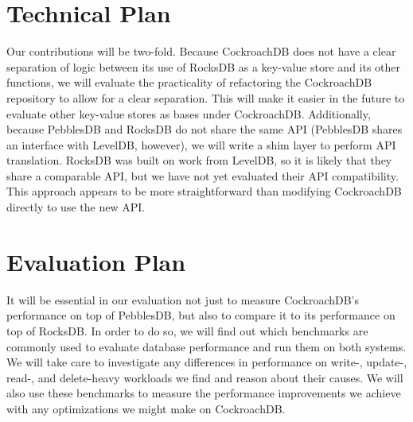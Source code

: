 \documentclass[10pt,twocolumn,letterpaper]{article}
\begin{document}
\section{Technical Plan}
Our contributions will be two-fold. Because CockroachDB does not have a clear separation of logic between its use of RocksDB as a key-value store and its other functions, we will evaluate the practicality of refactoring the CockroachDB repository to allow for a clear separation. This will make it easier in the future to evaluate other key-value stores as bases under CockroachDB. Additionally, because PebblesDB and RocksDB do not share the same API (PebblesDB shares an interface with LevelDB, however), we will write a shim layer to perform API translation. RocksDB was built on work from LevelDB, so it is likely that they share a comparable API, but we have not yet evaluated their API compatibility. This approach appears to be more straightforward than modifying CockroachDB directly to use the new API.


\section{Evaluation Plan}
It will be essential in our evaluation not just to measure CockroachDB's performance on top of PebblesDB, but also to compare it to its performance on top of RocksDB. In order to do so, we will find out which benchmarks are commonly used to evaluate database performance and run them on both systems. We will take care to investigate any differences in performance on write-, update-, read-, and delete-heavy workloads we find and reason about their causes. We will also use these benchmarks to measure the performance improvements we achieve with any optimizations we might make on CockroachDB.

\end{document}
